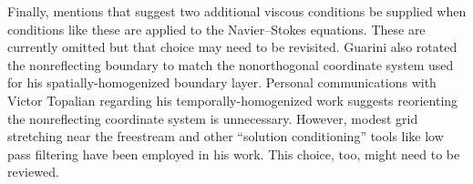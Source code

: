 Finally, \citet{Guarini1998} mentions that \citet{Poinsot1992Boundary}
suggest two additional viscous conditions be supplied when conditions like
these are applied to the Navier--Stokes equations.  These are currently omitted
but that choice may need to be revisited.  Guarini also rotated the
nonreflecting boundary to match the nonorthogonal coordinate system used for
his spatially-homogenized boundary layer.  Personal communications with Victor
Topalian regarding his temporally-homogenized work suggests reorienting the
nonreflecting coordinate system is unnecessary.  However, modest grid
stretching near the freestream and other ``solution conditioning'' tools like
low pass filtering have been employed in his work.  This choice, too, might
need to be reviewed.




